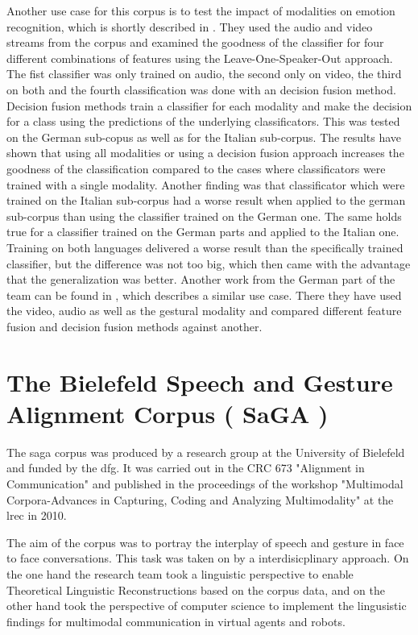 \documentclass[a4paper]{article}
\begin{document}
			Another use case for this corpus is to test the impact of modalities on emotion recognition, which is shortly described in \cite{Caridakis2013}. They used the audio and video streams from the corpus and examined the goodness of the classifier for four different combinations of features using the Leave-One-Speaker-Out approach. The fist classifier was only trained on audio, the second only on video, the third on both and the fourth classification was done with an decision fusion method. Decision fusion methods train a classifier for each modality and make the decision for a class using the predictions of the underlying classificators. This was tested on the German sub-copus as well as for the Italian sub-corpus. The results have shown that using all modalities or using a decision fusion approach increases the goodness of the classification compared to the cases where classificators were trained with a single modality. Another finding was that classificator which were trained on the Italian sub-corpus had a worse result when applied to the german sub-corpus than using the classifier trained on the German one. The same holds true for a classifier trained on the German parts and applied to the Italian one. Training on both languages delivered a worse result than the specifically trained classifier, but the difference was not too big, which then came with the advantage that the generalization was better. Another work from the German part of the team can be found in \cite{wagner:2011:1}, which describes a similar use case. There they have used the video, audio as well as the gestural modality and compared different feature fusion and decision fusion methods against another. 
	
	\section{The Bielefeld Speech and Gesture Alignment Corpus ( SaGA )}
		The \gls{saga} corpus was produced by a research group at the University of Bielefeld and funded by the \gls{dfg}. It was carried out in the CRC 673 "Alignment in Communication" and published in the proceedings of the workshop "Multimodal Corpora-Advances in Capturing, Coding and Analyzing Multimodality" at the \gls{lrec} in 2010.
		
		The aim of the corpus was to portray the interplay of speech and gesture in face to face conversations. This task was taken on by a interdisicplinary approach. On the one hand the research team took a linguistic perspective to enable Theoretical Linguistic Reconstructions based on the corpus data, and on the other hand took the perspective of computer science to implement the lingusistic findings for multimodal communication in virtual agents and robots. \cite[ch. 1]{Bielefeld2010}
	
\end{document}
